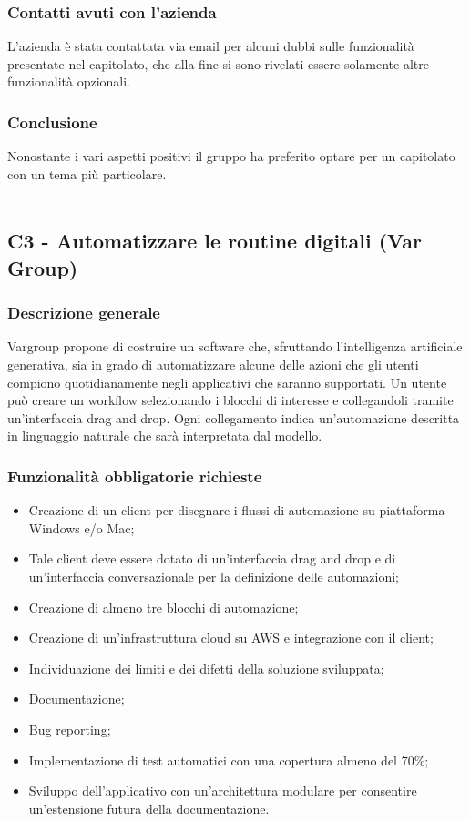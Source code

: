 \documentclass[10pt]{article}
\begin{document}
\subsubsection{Contatti avuti con l'azienda}
L’azienda è stata contattata via email per alcuni dubbi sulle funzionalità presentate nel capitolato, che alla fine si sono rivelati essere solamente altre funzionalità opzionali.

\subsubsection{Conclusione}
Nonostante i vari aspetti positivi il gruppo ha preferito optare per un capitolato con un tema più particolare.
\\\\
\subsection{C3 - Automatizzare le routine digitali (Var Group)}
\subsubsection{Descrizione generale}
Vargroup propone di costruire un software che, sfruttando l’intelligenza artificiale generativa, sia in grado di automatizzare alcune delle azioni che gli utenti compiono quotidianamente negli applicativi che saranno supportati. Un utente può creare un workflow selezionando i blocchi di interesse e collegandoli tramite un’interfaccia drag and drop. Ogni collegamento indica un'automazione descritta in linguaggio naturale che sarà interpretata dal modello.
\subsubsection{Funzionalità obbligatorie richieste}
\begin{itemize}
    \item Creazione di un client per disegnare i flussi di automazione su piattaforma Windows e/o Mac;
    \item Tale client deve essere dotato di un’interfaccia drag and drop e di un’interfaccia conversazionale per la definizione delle automazioni;
    \item Creazione di almeno tre blocchi di automazione;
    \item Creazione di un’infrastruttura cloud su AWS e integrazione con il client;
    \item Individuazione dei limiti e dei difetti della soluzione sviluppata;
    \item Documentazione;
    \item Bug reporting;
    \item Implementazione di test automatici con una copertura almeno del 70\%;
    \item Sviluppo dell’applicativo con un’architettura modulare per consentire un’estensione futura della documentazione.
\end{itemize}
\end{document}
